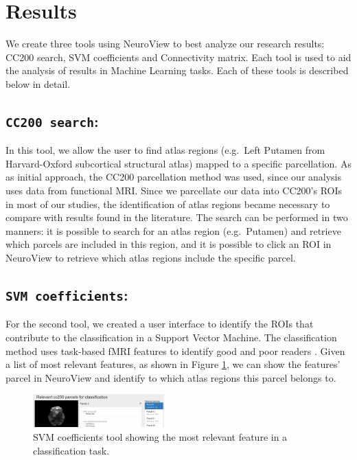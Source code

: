 \documentclass[twocolumn]{bmcart}%
\begin{document}
\section{Results}\label{results}

We create three tools using NeuroView to best analyze our research
results: CC200 search, SVM coefficients and Connectivity matrix. Each
tool is used to aid the analysis of results in Machine Learning tasks.
Each of these tools is described below in detail.

\subsection{\texorpdfstring{\texttt{CC200 search}:}{:}}\label{section}

In this tool, we allow the user to find atlas regions (e.g.~Left Putamen
from Harvard-Oxford subcortical structural atlas) mapped to a specific
parcellation. As as initial approach, the CC200 \cite{Craddock2012}
parcellation method was used, since our analysis uses data from
functional MRI. Since we parcellate our data into CC200's ROIs in most
of our studies, the identification of atlas regions became necessary to
compare with results found in the literature. The search can be
performed in two manners: it is possible to search for an atlas region
(e.g.~Putamen) and retrieve which parcels are included in this region,
and it is possible to click an ROI in NeuroView to retrieve which atlas
regions include the specific parcel.

\subsection{\texorpdfstring{\texttt{SVM coefficients}:}{:}}\label{section-1}

For the second tool, we created a user interface to identify the ROIs
that contribute to the classification in a Support Vector Machine. The
classification method uses task-based fMRI features to identify good and
poor readers \cite{Salles2013}. Given a list of most relevant features,
as shown in Figure \ref{fig:svm_coeffs}, we can show the features'
parcel in NeuroView and identify to which atlas regions this parcel
belongs to.

\begin{figure}[ht]
\centering
\includegraphics[width=0.45\textwidth]{figs/svm_coeffs.png}
\caption{SVM coefficients tool showing the most relevant feature in a classification task.}
\label{fig:svm_coeffs}
\end{figure}
\end{document}
